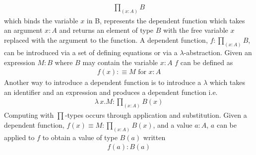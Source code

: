 \begin{align*}
    \prod_{(x : A)}B
\end{align*}
which binds the variable $x$ in B, represents the dependent function which takes
an argument $x : A$ and returns an element of type $B$ with the free variable
$x$ replaced with the argument to the function. A dependent function, $f :
\prod_{(x : A)}B$, can be introduced via a set of defining equations or via a
$\lambda$-abstraction. Given an expression $M : B$ where $B$ may contain the
variable $x : A$ $f$ can be defined as
\begin{align*}
    f (x) :\equiv M \textrm{ for } x : A
\end{align*}
Another way to introduce a dependent function is to introduce a $\lambda$ which
takes an identifier and an expression and produces a dependent function i.e.
\begin{align*}
    \lambda \, x . M : \prod_{(x : A)}B(x)
\end{align*}
Computing with $\prod$-types occurs through application and substitution. Given
a dependent function, $f(x) \equiv M : \prod_{(x : A)}B(x)$, and a value $a : A$, $a$ can be
applied to $f$ to obtain a value of type $B(a)$ written
\begin{align*}
    f(a) : B(a)
\end{align*}

